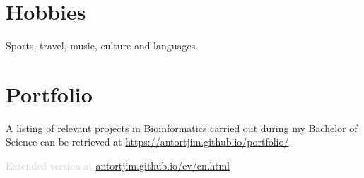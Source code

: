 \documentclass[paper=a4,fontsize=11pt]{article} %
\newlength{\spacebox}
\newcommand{\sepspace}{\vspace*{1em}}		%
\newcommand{\NewPart}[1]{\section*{
									{#1}}}
\newcommand{\PersonalEntry}[2]{
		\noindent\hangindent=2em\hangafter=0 %
		\parbox{\spacebox}{        %
		\textit{#1}}		       %
		\hspace{1.5em} #2 \par}    %
\newcommand{\EducationEntry}[4]{
		\noindent \textbf{#1} \hfill      %
		\colorbox{Black}{%
			\parbox{6em}{%
			\hfill\color{White}#2}} \par  %
		\noindent \textit{#3} \par        %
		\normalsize \par}
\newcommand{\AwardEntry}[4]{
		\noindent \textbf{#1} \hfill      %
		\colorbox{Black}{%
			\parbox{3em}{%
			\hfill\color{White}#2}} \par  %
		\noindent \textit{#3} \par        %
		\normalsize \par}
\newcommand{\VolunteeringEntry}[2]{      %
		\noindent\hangindent=2em\hangafter=0 %
		\parbox{\spacebox}{        %
		\textit{#1}}			   %
		\hspace{1.5em} #2 \par}    %
\begin{document}
  






  


  
  
%
%
%  
%
%





%
%


\NewPart{Hobbies}
Sports, travel, music, culture and languages.

\NewPart{Portfolio}

A listing of relevant projects in Bioinformatics carried out during my Bachelor of Science can be retrieved at \href{https://antortjim.github.io/portfolio/}{https://antortjim.github.io/portfolio/}.

%
%
%
%
%


%

\vfill
\textcolor{lightgray}{Extended version at \href{https://antortjim.github.io/cv/en.html}{antortjim.github.io/cv/en.html}}
\end{document}
